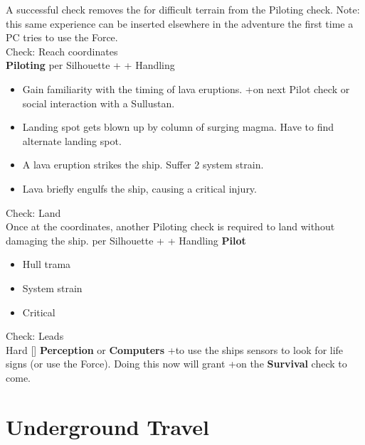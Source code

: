 \documentclass{book}
\newcommand{\df}{\difficulty}
\newcommand{\stb}{\setback}
\begin{document}
\begin{multicols}{2}
A successful check removes the \setback\setback\setback for difficult terrain from the Piloting check.  Note: this same experience can be inserted elsewhere in the adventure the first time a PC tries to use the Force.\\
Check: Reach coordinates\\
\textbf{Piloting} \difficulty per Silhouette + \stb\stb\stb + Handling 

\begin{itemize}
	\item \advantage Gain familiarity with the timing of lava eruptions.  +\boost on next Pilot check or social interaction with a Sullustan.
	\item \failure Landing spot gets blown up by column of surging magma. Have to find alternate landing spot.
	\item \threat \threat A lava eruption strikes the ship.  Suffer 2 system strain.
	\item \despair Lava briefly engulfs the ship, causing a critical injury.
\end{itemize}
Check: Land\\
Once at the coordinates, another Piloting check is required to land without damaging the ship.
\difficulty per Silhouette + \stb\stb + Handling \textbf{Pilot}
\begin{itemize}
    \item \failure Hull trama
    \item \threat System strain
	\item \despair Critical
\end{itemize}
Check: Leads\\
Hard [\df\df\df] \textbf{Perception} or \textbf{Computers} +\setback to use the ships sensors to look for life signs (or use the Force). Doing this now will grant +\boost on the \textbf{Survival} check to come.

\section{Underground Travel}


\end{multicols}
\end{document}
